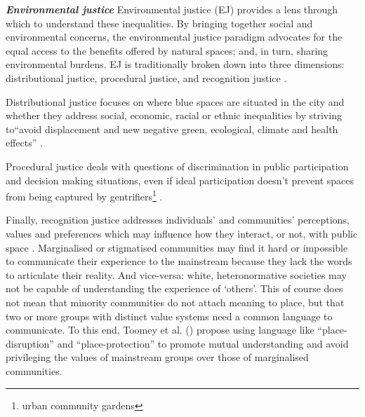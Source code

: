 \documentclass{article}
\newcommand{\bisection}[1]{\textbf{\textit{#1}}}
\begin{document}
\bisection{Environmental justice}
Environmental justice (EJ) provides a lens through which to understand these inequalities. By bringing together social and environmental concerns, the environmental justice paradigm advocates for the equal access to the benefits offered by natural spaces; and, in turn, sharing environmental burdens. 
EJ is traditionally broken down into three dimensions: distributional justice, procedural justice, and recognition justice \parencite{todo:cite schlosberg}.

Distributional justice focuses on where blue spaces are situated in the city and whether they address social, economic, racial or ethnic inequalities by striving to``avoid displacement and new negative green, ecological, climate and health effects'' \parencite{anguelovski2020expanding}.

Procedural justice deals with questions of discrimination in public participation and decision making situations, even if ideal participation doesn't prevent spaces from being captured by gentrifiers\footnote{urban community gardens} \parencite{anguelovski2020expanding}. 

Finally, recognition justice addresses individuals' and communities’ perceptions, values and preferences which may influence how they interact, or not, with public space \parencite{anguelovski2020expanding}.
Marginalised or stigmatised communities may find it hard or impossible to communicate their experience to the mainstream because they lack the words to articulate their reality. And vice-versa: white, heteronormative societies may not be capable of understanding the experience of `others'. This of course does not mean that minority communities do not attach meaning to place, but that two or more groups with distinct value systems need a common language to communicate. To this end, Toomey et al. (\citeyear{toomey2021place}) propose using language like ``place-disruption'' and ``place-protection'' to promote mutual understanding and avoid privileging the values of mainstream groups over those of marginalised communities.
\end{document}
